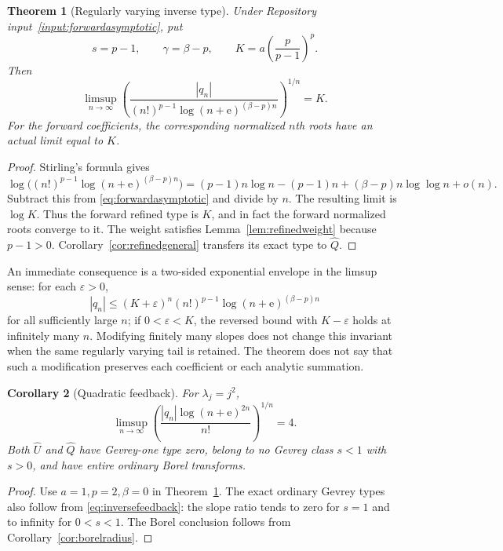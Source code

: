 \documentclass[11pt,a4paper]{article}
\numberwithin{equation}{section}
\newtheorem{theorem}{Theorem}[section]
\newtheorem{corollary}[theorem]{Corollary}
\theoremstyle{definition}
\theoremstyle{remark}
\newcommand{\ee}{\mathrm e}
\newcommand{\Q}{\widehat Q}
\newcommand{\U}{\widehat U}
\begin{document}
\begin{theorem}[Regularly varying inverse type]
\label{thm:refinedfeedback}
Under Repository input~\ref{input:forwardasymptotic}, put
\begin{equation}
 s=p-1,\qquad \gamma=\beta-p,\qquad
 K=a\left(\frac{p}{p-1}\right)^p.
 \label{eq:parameters}
\end{equation}
Then
\begin{equation}
 \boxed{\displaystyle
 \limsup_{n\to\infty}
 \left(\frac{|q_n|}{(n!)^{p-1}\log(n+\ee)^{(\beta-p)n}}\right)^{1/n}
 =K.}
 \label{eq:refinedfeedback}
\end{equation}
For the forward coefficients, the corresponding normalized $n$th roots
have an actual limit equal to $K$.
\end{theorem}
\begin{proof}
Stirling's formula gives
\[
 \log\bigl((n!)^{p-1}\log(n+\ee)^{(\beta-p)n}\bigr)
 =(p-1)n\log n-(p-1)n
   +(\beta-p)n\log\log n+o(n).
\]
Subtract this from \eqref{eq:forwardasymptotic} and divide by $n$.
The resulting limit is $\log K$. Thus the forward refined type is $K$,
and in fact the forward normalized roots converge to it. The weight
satisfies Lemma~\ref{lem:refinedweight} because $p-1>0$.
Corollary~\ref{cor:refinedgeneral} transfers its exact type to $\Q$.
\end{proof}

An immediate consequence is a two-sided exponential envelope in the
limsup sense: for each $\varepsilon>0$,
\[
 |q_n|\le(K+\varepsilon)^n(n!)^{p-1}
             \log(n+\ee)^{(\beta-p)n}
\]
for all sufficiently large $n$; if $0<\varepsilon<K$, the reversed bound
with $K-\varepsilon$ holds at infinitely many $n$. Modifying finitely
many slopes does not change this invariant when the same regularly
varying tail is retained. The theorem does not say that such a
modification preserves each coefficient or each analytic summation.

\begin{corollary}[Quadratic feedback]
\label{cor:quadratic}
For $\lambda_j=j^2$,
\begin{equation}
 \limsup_{n\to\infty}
 \left(\frac{|q_n|\log(n+\ee)^{2n}}{n!}\right)^{1/n}=4.
 \label{eq:quadratic}
\end{equation}
Both $\U$ and $\Q$ have Gevrey-one type zero, belong to no Gevrey
class $s<1$ with $s>0$, and have entire ordinary Borel transforms.
\end{corollary}
\begin{proof}
Use $a=1,p=2,\beta=0$ in Theorem~\ref{thm:refinedfeedback}.
The exact ordinary Gevrey types also follow from
\eqref{eq:inversefeedback}: the slope ratio tends to zero for $s=1$
and to infinity for $0<s<1$. The Borel conclusion follows from
Corollary~\ref{cor:borelradius}.
\end{proof}
\end{document}
